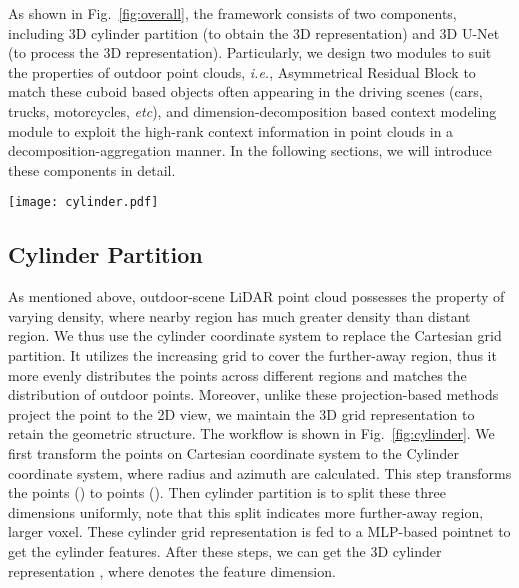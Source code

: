 \documentclass{article}
\def\ie{\emph{i.e.}}
\def\etc{\emph{etc}}
\begin{document}
As shown in Fig.~\ref{fig:overall}, the framework consists of two components, including 3D cylinder partition (to obtain the 3D representation) and 3D U-Net (to process the 3D representation). Particularly, we design two modules to suit the properties of outdoor point clouds, \ie, Asymmetrical Residual Block to match these cuboid based objects often appearing in the driving scenes (cars, trucks, motorcycles, \etc), and dimension-decomposition based context modeling module to exploit the high-rank context information in point clouds in a decomposition-aggregation manner. In the following sections, we will introduce these components in detail.



    \begin{figure*}
    \centering
    \texttt{[image: cylinder.pdf]}
    \caption{The pipeline of Cylinder Partition. It first transforms points on Cartesian coordinate to Cylinder coordinate. Then a cylinder partition is introduced to perform the voxelization. Finally, cylinder features are produced by a simplified pointnet.}
    \label{fig:cylinder}
    \end{figure*}


\subsection{Cylinder Partition}
As mentioned above, outdoor-scene LiDAR point cloud possesses the property of varying density, where nearby region has much greater density than distant region. We thus use the cylinder coordinate system to replace the Cartesian grid partition. 
It utilizes the increasing grid to cover the further-away region, thus it more evenly distributes the points across different regions and matches the distribution of outdoor points. Moreover, unlike these projection-based methods project the point to the 2D view, we maintain the 3D grid representation to retain the geometric structure. The workflow is shown in Fig.~\ref{fig:cylinder}. We first transform the points on Cartesian coordinate system to the Cylinder coordinate system, where radius  and azimuth  are calculated. This step transforms the points () to points (). Then cylinder partition is to split these three dimensions uniformly, note that this split indicates more further-away region, larger voxel. These cylinder grid representation is fed to a MLP-based pointnet to get the cylinder features.
After these steps, we can get the 3D cylinder representation , where  denotes the feature dimension.
\end{document}
